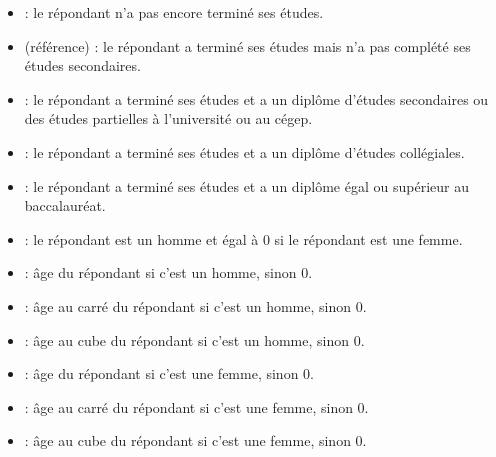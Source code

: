 \documentclass[letterpaper,10pt,french]{sphinxmanual}
\begin{document}
\begin{itemize}
\item {} 
 : le répondant n’a pas encore terminé ses études.

\item {} 
 (référence) : le répondant a terminé ses études mais n’a pas complété ses études secondaires.

\item {} 
 : le répondant a terminé ses études et a un diplôme d’études secondaires ou des études partielles à l’université ou au cégep.

\item {} 
 : le répondant a terminé ses études et a un diplôme d’études collégiales.

\item {} 
 : le répondant a terminé ses études et a un diplôme égal ou supérieur au baccalauréat.

\end{itemize}


\begin{itemize}
\item {} 
 : le répondant est un homme et égal à 0 si le répondant est une femme.

\end{itemize}

\begin{itemize}
\item {} 
 : âge du répondant si c’est un homme, sinon 0.

\item {} 
 : âge au carré du répondant si c’est un homme, sinon 0.

\item {} 
 : âge au cube du répondant si c’est un homme, sinon 0.

\item {} 
 : âge du répondant si c’est une femme, sinon 0.

\item {} 
 : âge au carré du répondant si c’est une femme, sinon 0.

\item {} 
 : âge au cube du répondant si c’est une femme, sinon 0.

\end{itemize}
\end{document}
